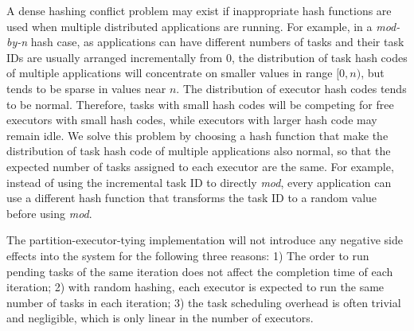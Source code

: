 \documentclass[10pt,journal,compsoc]{IEEEtran}
\begin{document}
A dense hashing conflict problem may exist if inappropriate hash functions are used when multiple distributed applications are running. 
For example, in a \emph{mod-by-n} hash case, as applications can have different numbers of tasks and their task IDs are usually arranged incrementally from 0, 
the distribution of task hash codes of multiple applications
will concentrate on smaller values in range $[0, n)$, but tends to be sparse in values near $n$. 
The distribution of executor hash codes 
tends to be normal. Therefore, tasks with small hash codes will be competing for free executors with small hash codes, while executors with larger hash code 
may remain idle.
We solve this problem by choosing a hash function that make 
the distribution of task hash code of multiple applications also normal, 
so that the expected number of tasks assigned to each executor are the same.
For example, instead of using the incremental task ID to directly \emph{mod}, every application can use a different hash function that transforms the task ID to a random value before using \emph{mod}.


The partition-executor-tying implementation will not introduce any negative
side effects into the system for the following three reasons: 1)  The
order to run pending tasks of the same iteration does not affect the
completion time of each iteration; 2) with random hashing, each executor
is expected to run the same number of tasks in each iteration;
3) the task scheduling overhead is often trivial and negligible, which
is only linear in the number of executors.
\end{document}
